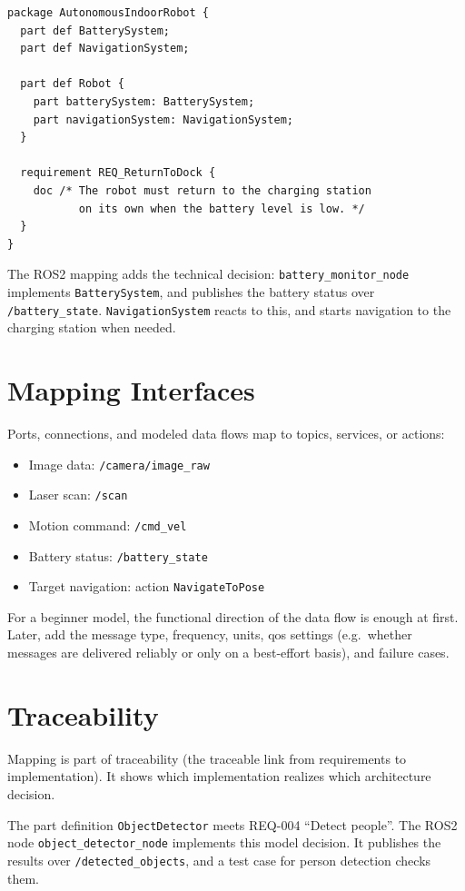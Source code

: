 \begin{lstlisting}
package AutonomousIndoorRobot {
  part def BatterySystem;
  part def NavigationSystem;

  part def Robot {
    part batterySystem: BatterySystem;
    part navigationSystem: NavigationSystem;
  }

  requirement REQ_ReturnToDock {
    doc /* The robot must return to the charging station
           on its own when the battery level is low. */
  }
}
\end{lstlisting}

The ROS2 mapping adds the technical decision: \texttt{battery\_monitor\_node} implements \texttt{BatterySystem}, and publishes the battery status over \texttt{/battery\_state}. \texttt{NavigationSystem} reacts to this, and starts navigation to the charging station when needed.

\section{Mapping Interfaces}
Ports, connections, and modeled data flows map to topics, services, or actions:

\begin{itemize}
    \item Image data: \texttt{/camera/image\_raw}
    \item Laser scan: \texttt{/scan}
    \item Motion command: \texttt{/cmd\_vel}
    \item Battery status: \texttt{/battery\_state}
    \item Target navigation: action \texttt{NavigateToPose}
\end{itemize}

For a beginner model, the functional direction of the data flow is enough at first. Later, add the message type, frequency, units, \gls{qos} settings (e.g.\ whether messages are delivered reliably or only on a best-effort basis), and failure cases.

\section{Traceability}
Mapping is part of traceability (the traceable link from requirements to implementation). It shows which implementation realizes which architecture decision.

\begin{praxisbox}
The part definition \texttt{ObjectDetector} meets REQ-004 \enquote{Detect people}. The ROS2 node \texttt{object\_detector\_node} implements this model decision. It publishes the results over \texttt{/detected\_objects}, and a test case for person detection checks them.
\end{praxisbox}

